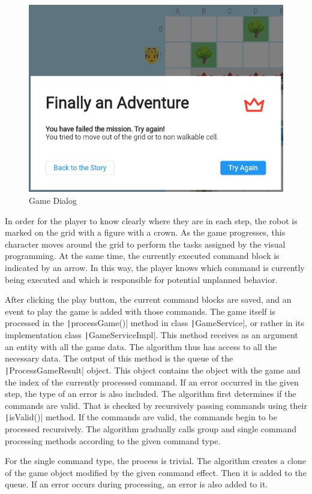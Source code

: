 \begin{figure}
    \centering
    \includegraphics[width=0.7\linewidth]{assets/implementation/gamedialog.jpeg}
    \caption{Game Dialog}
    \label{fig:gamedialog}
\end{figure}

In order for the player to know clearly where they are in each step, the robot is marked on the grid with a figure with a crown.
As the game progresses, this character moves around the grid to perform the tasks assigned by the visual programming.
At the same time, the currently executed command block is indicated by an arrow.
In this way, the player knows which command is currently being executed and which is responsible for potential unplanned behavior.

After clicking the play button, the current command blocks are saved, and an event to play the game is added with those commands.
The game itself is processed in the \texttt|processGame()| method in class \texttt|GameService|, or rather in its implementation class \texttt|GameServiceImpl|.
This method receives as an argument an entity with all the game data.
The algorithm thus has access to all the necessary data.
The output of this method is the queue of the \texttt|ProcessGameResult| object.
This object contains the object with the game and the index of the currently processed command.
If an error occurred in the given step, the type of an error is also included. 
The algorithm first determines if the commands are valid.
That is checked by recursively passing commands using their \texttt|isValid()| method.
If the commands are valid, the commands begin to be processed recursively.
The algorithm gradually calls group and single command processing methods according to the given command type.

For the single command type, the process is trivial.
The algorithm creates a clone of the game object modified by the given command effect.
Then it is added to the queue.
If an error occurs during processing, an error is also added to it.

